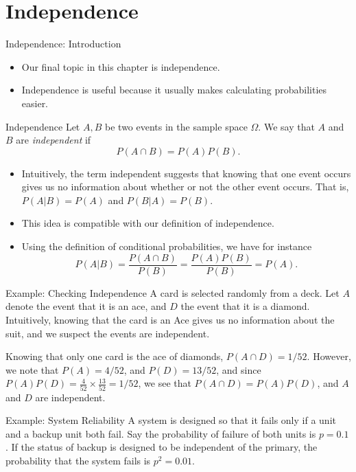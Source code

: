 \section{Independence}

\begin{frame}[allowframebreaks]{Independence: Introduction}

  \begin{itemize}
    \item Our final topic in this chapter is \alert{independence}.
    \item Independence is useful because it usually makes calculating probabilities easier.
  \end{itemize}

  \begin{block}{Independence}
    Let $A, B$ be two events in the sample space $\Omega$. We say that $A$ and $B$ are \emph{independent} if
    $$
    P(A \cap B) = P(A)P(B).
    $$
  \end{block}

  \framebreak

  \begin{itemize}
    \item Intuitively, the term \alert{independent} suggests that knowing that one event occurs gives us no information about whether or not the other event occurs. That is, $P(A | B) = P(A)$ and $P(B | A) = P(B)$.

    \item This idea is compatible with our definition of independence.
    \item Using the definition of conditional probabilities, we have for instance
  $$
  P(A|B) = \frac{P(A \cap B)}{P(B)} = \frac{P(A)P(B)}{P(B)} = P(A).
  $$
  \end{itemize}

  \begin{exampleblock}{Example: Checking Independence}
    A card is selected randomly from a deck. Let $A$ denote the event that it is an ace, and $D$ the event that it is a diamond.
    Intuitively, knowing that the card is an Ace gives us no information about the suit, and we suspect the events are independent.

    Knowing that only one card is the ace of diamonds, $P(A \cap D) = 1/52$. However, we note that $P(A) = 4/52$, and $P(D) = 13/52$, and since $P(A)P(D) = \frac{4}{52}\times\frac{13}{52} = 1/52$, we see that $P(A \cap D) = P(A)P(D)$, and $A$ and $D$ are independent.
  \end{exampleblock}

  \begin{exampleblock}{Example: System Reliability}
    A system is designed so that it fails only if a unit and a backup unit both fail.
    Say the probability of failure of both units is $p = 0.1$.
    If the status of backup is designed to be independent of the primary, the probability that the system fails is $p^2 = 0.01$.
  \end{exampleblock}

\end{frame}

